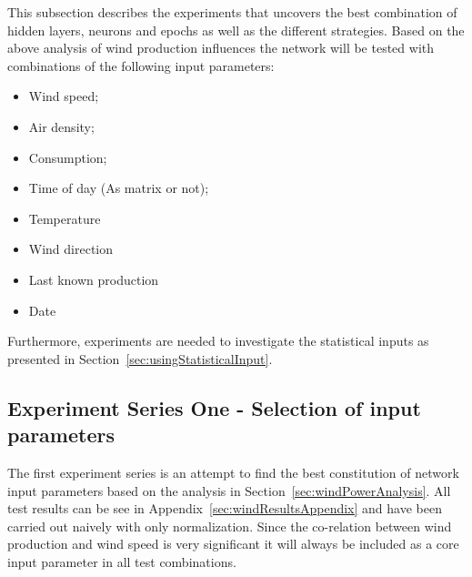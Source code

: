 This subsection describes the experiments that uncovers the best combination of hidden layers, neurons and epochs as well as the different strategies. Based on the above analysis of wind production influences the network will be tested with combinations of the following input parameters:

\begin{itemize}
\item Wind speed;
\item Air density;
\item Consumption;
\item Time of day (As matrix or not);
\item Temperature
\item Wind direction
\item Last known production
\item Date
\end{itemize}

Furthermore, experiments are needed to investigate the statistical inputs as presented in Section~\ref{sec:usingStatisticalInput}. 


\subsection{Experiment Series One - Selection of input parameters}
The first experiment series is an attempt to find the best constitution of network input parameters based on the analysis in Section~\ref{sec:windPowerAnalysis}. All test results can be see in Appendix~\ref{sec:windResultsAppendix} and have been carried out naively with only normalization. Since the co-relation between wind production and wind speed is very significant it will always be included as a core input parameter in all test combinations.

